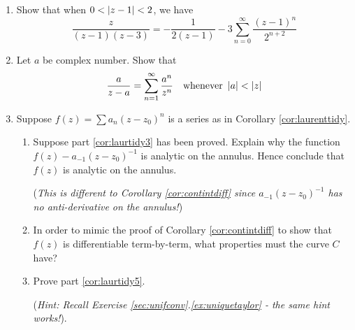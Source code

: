 \begin{exercises}
\begin{enumerate}
	
		\item Show that when $0<\left| z-1\right|<2$,  we have
		\[
			\frac z{(z-1)(z-3)}=-\frac 1{2(z-1)}-3\sum_{n=0}^\infty\frac{(z-1)^n}{2^{n+2}}
		\]
		
		
		\item Let $a$ be complex number. Show that
		\[
			\frac a{z-a}=\sum_{n=1}^\infty\frac{a^n}{z^n}
			\quad\text{whenever }
			\left| a\right|<\left| z\right|
		\]
		
		
	  \item\label{exs:laurenttidy} Suppose $f(z)=\sum a_n(z-z_0)^n$ is a series as in Corollary \ref{cor:laurenttidy}.
	  \begin{enumerate}
	    \item Suppose part \ref*{cor:laurtidy3} has been proved. Explain why the function $f(z)-a_{-1}(z-z_0)^{-1}$ is analytic on the annulus. Hence conclude that $f(z)$ is analytic on the annulus.\par
	    (\emph{This is different to Corollary \ref{cor:contintdiff} since $a_{-1}(z-z_0)^{-1}$ has no anti-derivative on the annulus!})
	    \item In order to mimic the proof of Corollary \ref{cor:contintdiff} to show that $f(z)$ is differentiable term-by-term, what properties must the curve $C$ have?
	    \item Prove part \ref*{cor:laurtidy5}.\par
	    (\emph{Hint: Recall Exercise \ref*{sec:unifconv}.\ref{ex:uniquetaylor} - the same hint works!}).
		\end{enumerate}
	\end{enumerate}
\end{exercises}

